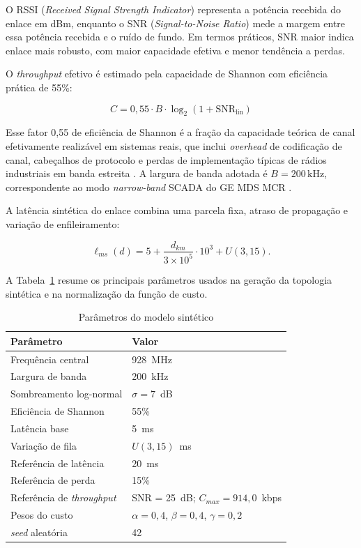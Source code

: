 \documentclass[conference]{IEEEtran}
\begin{document}
O RSSI (\textit{Received Signal Strength Indicator}) representa a potência
recebida do enlace em dBm, enquanto o SNR (\textit{Signal-to-Noise Ratio})
mede a margem entre essa potência recebida e o ruído de fundo. Em termos
práticos, SNR maior indica enlace mais robusto, com maior capacidade efetiva
e menor tendência a perdas.

O \textit{throughput} efetivo é estimado pela capacidade de Shannon com eficiência
prática de 55\%:

\begin{equation}
  C = 0{,}55 \cdot B \cdot \log_2(1 + \text{SNR}_\text{lin})
\end{equation}

Esse fator 0{,}55 de eficiência de Shannon é a fração da capacidade teórica de
canal efetivamente realizável em sistemas reais, que inclui \textit{overhead} de
codificação de canal, cabeçalhos de protocolo e perdas de implementação
típicas de rádios industriais em banda estreita \cite{rappaport2002}.
A largura de banda adotada é $B = 200\,\text{kHz}$, correspondente ao
modo \textit{narrow-band} SCADA do GE MDS MCR \cite{ge_mds_mcr}.

A latência sintética do enlace combina uma parcela fixa, atraso de
propagação e variação de enfileiramento:

\begin{equation}
  \ell_{ms}(d) = 5 + \frac{d_{km}}{3 \times 10^5}\cdot 10^3 + U(3,15).
\end{equation}

A Tabela~\ref{tab:parametros} resume os principais parâmetros usados na
geração da topologia sintética e na normalização da função de custo.

\begin{table}[t]
\caption{Parâmetros do modelo sintético}
\label{tab:parametros}
\centering
\scriptsize
\begin{tabular}{p{}p{}}
\toprule
Parâmetro & Valor \\
\midrule
Frequência central & 928~MHz \\
Largura de banda & 200~kHz \\
Sombreamento log-normal & $\sigma = 7$~dB \\
Eficiência de Shannon & 55\% \\
Latência base & 5~ms \\
Variação de fila & $U(3,15)$~ms \\
Referência de latência & 20~ms \\
Referência de perda & 15\% \\
Referência de \textit{throughput} & SNR = 25~dB; $C_{max}=914{,}0$~kbps \\
Pesos do custo & $\alpha=0{,}4$, $\beta=0{,}4$, $\gamma=0{,}2$ \\
\textit{seed} aleatória & 42 \\
\bottomrule
\end{tabular}
\end{table}
\end{document}
